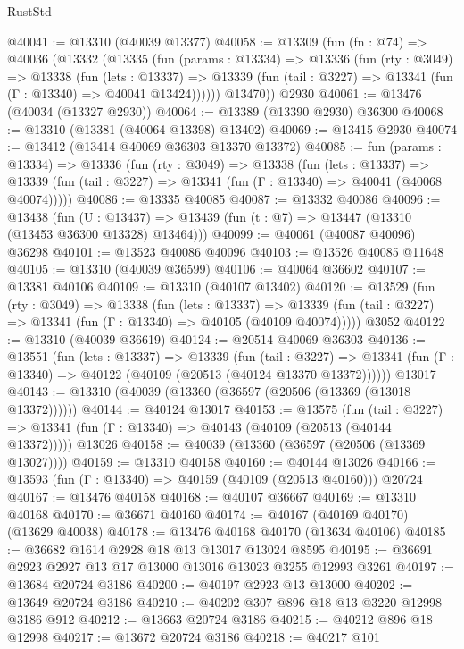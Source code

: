 \begin{lexlean}{RustStd}
\begin{coremodule}
@40041 := @13310 (@40039 @13377)
@40058 := @13309
    (fun (fn : @74) =>
    @40036
      (@13332
        (@13335
          (fun (params : @13334) =>
          @13336
            (fun (rty : @3049) =>
            @13338
              (fun (lets : @13337) =>
              @13339 (fun (tail : @3227) => @13341 (fun (Γ : @13340) => @40041 @13424))))))
        @13470))
    @2930
@40061 := @13476 (@40034 (@13327 @2930))
@40064 := @13389 (@13390 @2930) @36300
@40068 := @13310 (@13381 (@40064 @13398) @13402)
@40069 := @13415 @2930
@40074 := @13412 (@13414 @40069 @36303 @13370 @13372)
@40085 := fun (params : @13334) =>
  @13336
    (fun (rty : @3049) =>
    @13338
      (fun (lets : @13337) =>
      @13339 (fun (tail : @3227) => @13341 (fun (Γ : @13340) => @40041 (@40068 @40074)))))
@40086 := @13335 @40085
@40087 := @13332 @40086
@40096 := @13438
    (fun (U : @13437) => @13439 (fun (t : @7) => @13447 (@13310 (@13453 @36300 @13328) @13464)))
@40099 := @40061 (@40087 @40096) @36298
@40101 := @13523 @40086 @40096
@40103 := @13526 @40085 @11648
@40105 := @13310 (@40039 @36599)
@40106 := @40064 @36602
@40107 := @13381 @40106
@40109 := @13310 (@40107 @13402)
@40120 := @13529
    (fun (rty : @3049) =>
    @13338
      (fun (lets : @13337) =>
      @13339 (fun (tail : @3227) => @13341 (fun (Γ : @13340) => @40105 (@40109 @40074)))))
    @3052
@40122 := @13310 (@40039 @36619)
@40124 := @20514 @40069 @36303
@40136 := @13551
    (fun (lets : @13337) =>
    @13339
      (fun (tail : @3227) =>
      @13341 (fun (Γ : @13340) => @40122 (@40109 (@20513 (@40124 @13370 @13372))))))
    @13017
@40143 := @13310 (@40039 (@13360 (@36597 (@20506 (@13369 (@13018 @13372))))))
@40144 := @40124 @13017
@40153 := @13575
    (fun (tail : @3227) => @13341 (fun (Γ : @13340) => @40143 (@40109 (@20513 (@40144 @13372)))))
    @13026
@40158 := @40039 (@13360 (@36597 (@20506 (@13369 @13027))))
@40159 := @13310 @40158
@40160 := @40144 @13026
@40166 := @13593 (fun (Γ : @13340) => @40159 (@40109 (@20513 @40160))) @20724
@40167 := @13476 @40158
@40168 := @40107 @36667
@40169 := @13310 @40168
@40170 := @36671 @40160
@40174 := @40167 (@40169 @40170) (@13629 @40038)
@40178 := @13476 @40168 @40170 (@13634 @40106)
@40185 := @36682 @1614 @2928 @18 @13 @13017 @13024 @8595
@40195 := @36691 @2923 @2927 @13 @17 @13000 @13016 @13023 @3255 @12993 @3261
@40197 := @13684 @20724 @3186
@40200 := @40197 @2923 @13 @13000
@40202 := @13649 @20724 @3186
@40210 := @40202 @307 @896 @18 @13 @3220 @12998 @3186 @912
@40212 := @13663 @20724 @3186
@40215 := @40212 @896 @18 @12998
@40217 := @13672 @20724 @3186
@40218 := @40217 @101

\end{coremodule}
\end{lexlean}
